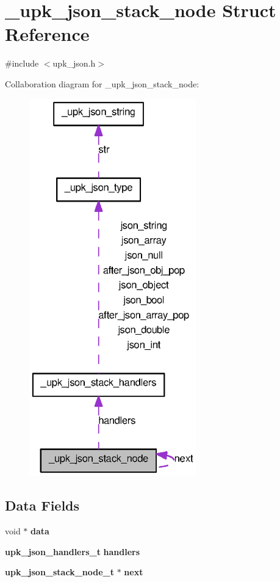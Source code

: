 \section{\_\-upk\_\-json\_\-stack\_\-node Struct Reference}
\label{struct__upk__json__stack__node}


{\ttfamily \#include $<$upk\_\-json.h$>$}



Collaboration diagram for \_\-upk\_\-json\_\-stack\_\-node:\nopagebreak
\begin{figure}[H]
\begin{center}
\leavevmode
\includegraphics[width=205pt]{struct__upk__json__stack__node__coll__graph}
\end{center}
\end{figure}
\subsection*{Data Fields}
\begin{DoxyCompactItemize}
\item 
void $\ast$ {\bf data}
\item 
{\bf upk\_\-json\_\-handlers\_\-t} {\bf handlers}
\item 
{\bf upk\_\-json\_\-stack\_\-node\_\-t} $\ast$ {\bf next}
\end{DoxyCompactItemize}


